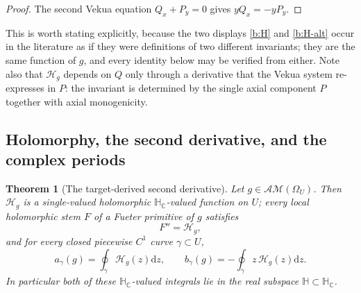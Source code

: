 \documentclass[11pt,a4paper]{article}
\numberwithin{equation}{section}
\newtheorem{theorem}{Theorem}[section]
\theoremstyle{definition}
\theoremstyle{remark}
\theoremstyle{plain}
\newcommand{\HH}{\mathbb H}
\newcommand{\HC}{\mathbb H_{\mathbb C}}
\newcommand{\AM}{\mathcal{AM}}
\newcommand{\Om}{\Omega}
\newcommand{\Hg}{\mathcal H_{g}}      %
\newcommand{\dd}{\mathrm d}
\begin{document}
\begin{proof}
The second Vekua equation $Q_x+P_y=0$ gives $yQ_x=-yP_y$.
\end{proof}

This is worth stating explicitly, because the two displays \eqref{b:H} and
\eqref{b:H-alt} occur in the literature as if they were definitions of two
different invariants; they are the same function of $g$, and every identity
below may be verified from either.  Note also that $\Hg$ depends on $Q$ only
through a derivative that the Vekua system re-expresses in $P$: the invariant
is determined by the single axial component $P$ together with axial
monogenicity.

\subsection{Holomorphy, the second derivative, and the complex periods}
\label{b:sub:Hthm}

\begin{theorem}[The target-derived second derivative]
\label{b:thm:invariant}
Let $g\in\AM(\Om_U)$.  Then $\Hg$ is a single-valued holomorphic
$\HC$-valued function on $U$; every local holomorphic stem $F$ of a Fueter
primitive of $g$ satisfies
\begin{equation}
 F''=\Hg ,
 \label{b:H-second}
\end{equation}
and for every closed piecewise $C^1$ curve $\gamma\subset U$,
\begin{equation}
 a_\gamma(g)=\oint_\gamma\Hg(z)\dd z,
 \qquad
 b_\gamma(g)=-\oint_\gamma z\,\Hg(z)\dd z .
 \label{b:complex-periods}
\end{equation}
In particular both of these $\HC$-valued integrals lie in the real subspace
$\HH\subset\HC$.
\end{theorem}
\end{document}
